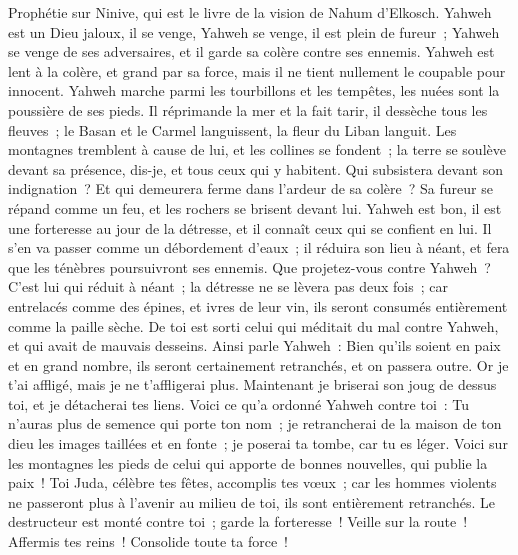 \begin{multicols}{2}
\VerseOne{}Prophétie sur Ninive, qui est le livre de la vision de Nahum d'Elkosch.
Yahweh est un Dieu jaloux, il se venge, Yahweh se venge, il est plein de fureur~; Yahweh se venge de ses adversaires, et il garde sa colère contre ses ennemis.
Yahweh est lent à la colère, et grand par sa force, mais il ne tient nullement le coupable pour innocent. Yahweh marche parmi les tourbillons et les tempêtes, les nuées sont la poussière de ses pieds.
Il réprimande la mer et la fait tarir, il dessèche tous les fleuves~; le Basan et le Carmel languissent, la fleur du Liban languit.
Les montagnes tremblent à cause de lui, et les collines se fondent~; la terre se soulève devant sa présence, dis-je, et tous ceux qui y habitent.
Qui subsistera devant son indignation~? Et qui demeurera ferme dans l'ardeur de sa colère~? Sa fureur se répand comme un feu, et les rochers se brisent devant lui.
Yahweh est bon, il est une forteresse au jour de la détresse, et il connaît ceux qui se confient en lui.
Il s'en va passer comme un débordement d'eaux~; il réduira son lieu à néant, et fera que les ténèbres poursuivront ses ennemis.
Que projetez-vous contre Yahweh~? C'est lui qui réduit à néant~; la détresse ne se lèvera pas deux fois~;
car entrelacés comme des épines, et ivres de leur vin, ils seront consumés entièrement comme la paille sèche.
De toi est sorti celui qui méditait du mal contre Yahweh, et qui avait de mauvais desseins.
Ainsi parle Yahweh~: Bien qu'ils soient en paix et en grand nombre, ils seront certainement retranchés, et on passera outre. Or je t'ai affligé, mais je ne t'affligerai plus.
Maintenant je briserai son joug de dessus toi, et je détacherai tes liens.
Voici ce qu'a ordonné Yahweh contre toi~: Tu n'auras plus de semence qui porte ton nom~; je retrancherai de la maison de ton dieu les images taillées et en fonte~; je poserai ta tombe, car tu es léger.
\VerseOne{}Voici sur les montagnes les pieds de celui qui apporte de bonnes nouvelles, qui publie la paix~! Toi Juda, célèbre tes fêtes, accomplis tes vœux~; car les hommes violents ne passeront plus à l'avenir au milieu de toi, ils sont entièrement retranchés.
Le destructeur est monté contre toi~; garde la forteresse~! Veille sur la route~! Affermis tes reins~! Consolide toute ta force~!

\end{multicols}
